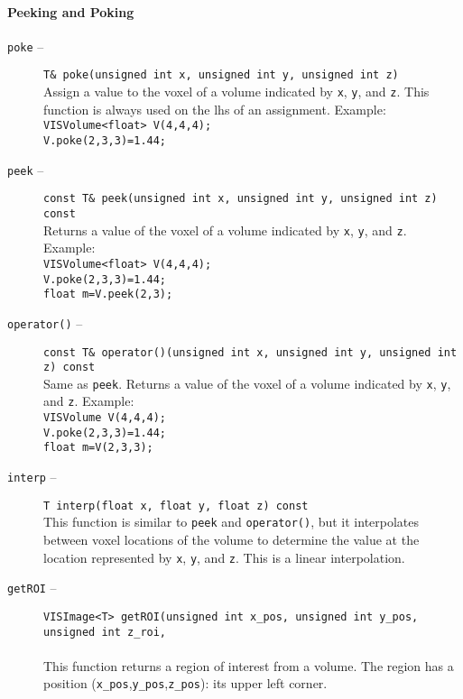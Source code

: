 \paragraph{Peeking and Poking}
\begin{description}
\item[{\tt poke} --]
{\tt T\& poke(unsigned int x, unsigned int y, unsigned int z)}\\
Assign a value to the voxel of a volume indicated by
{\tt x}, {\tt y}, and {\tt z}.
This function is always used on the lhs of an assignment.  Example:\\
{\tt VISVolume<float> V(4,4,4);}\\
{\tt V.poke(2,3,3)=1.44;}
\item[{\tt peek} --]
{\tt const T\& peek(unsigned int x, unsigned int y, unsigned int z) const}\\
Returns a value of the voxel of a volume indicated by
{\tt x}, {\tt y}, and {\tt z}.  Example:\\
  {\tt VISVolume<float> V(4,4,4);}\\
  {\tt V.poke(2,3,3)=1.44;}\\
  {\tt float m=V.peek(2,3);}
\item [{\tt operator()} --]
{\tt const T\& operator()(unsigned int x, unsigned int y, unsigned int z) const}\\
Same as {\tt peek}.
Returns a value of the voxel of a volume indicated by
{\tt x}, {\tt y}, and {\tt z}.  Example:\\
  {\tt VISVolume V(4,4,4);}\\
  {\tt V.poke(2,3,3)=1.44;}\\
  {\tt float m=V(2,3,3);}\\
\item[{\tt interp} --]
{\tt T interp(float x, float y, float z) const}\\
This function is similar to {\tt peek} and {\tt operator()}, but
it interpolates between voxel locations of the volume to determine the value
at the location represented by {\tt x}, {\tt y}, and {\tt z}.
This is a linear interpolation.
\item[{\tt getROI} --]
{\tt VISImage<T> getROI(unsigned int x\_pos, unsigned int y\_pos, unsigned int z\_roi,}\\
\hspace*{0.25in}{\tt unsigned int w\_roi, unsigned int h\_roi, unsigned int d\_roi)}\\
This function returns a region of interest from a volume.
The region has a position ({\tt x\_pos},{\tt y\_pos},{\tt z\_pos}): its upper left corner.

\end{description}
